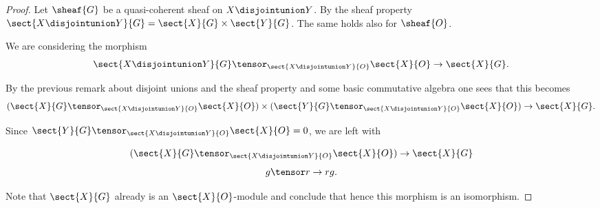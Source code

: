 
\begin{proof}
Let $\sheaf{G}$ be a quasi-coherent sheaf on $X \disjointunion Y$.
By the sheaf property $\sect{X \disjointunion Y}{G} = \sect{X}{G} \times \sect{Y}{G}$.
The same holds also for $\sheaf{O}$.

We are considering the morphism
\[
\sect{X \disjointunion Y}{G} \tensor_{\sect{X \disjointunion Y}{O}} \sect{X}{O} \rightarrow \sect{X}{G}.
\]

By the previous remark about disjoint unions and the sheaf property and some basic commutative algebra one sees that this becomes 
\[
(\sect{X}{G} \tensor_{\sect{X \disjointunion Y}{O}} \sect{X}{O}) 
\times (\sect{Y}{G} \tensor_{\sect{X \disjointunion Y}{O}} \sect{X}{O}) \rightarrow \sect{X}{G}.
\]

Since $\sect{Y}{G} \tensor_{\sect{X \disjointunion Y}{O}} \sect{X}{O} = 0$, we are left with

\[
(\sect{X}{G} \tensor_{\sect{X \disjointunion Y}{O}} \sect{X}{O}) \rightarrow \sect{X}{G}
\]
\[
g \tensor r \rightarrow rg.
\]

Note that $\sect{X}{G}$ already is an $\sect{X}{O}$-module and conclude that hence this morphism is an isomorphism.
\end{proof}
